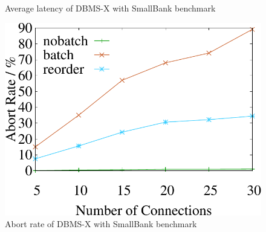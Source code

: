 \begin{figure}[t]
\begin{minipage}[b]{0.31\linewidth}
	\caption{Average latency of DBMS-X with SmallBank benchmark}
	\label{fig:hekaton:latency}
	\end{minipage}
	\begin{minipage}[b]{0.31\linewidth}
	\centering
	\includegraphics[width=\textwidth]{./exp_fig/hekaton/pdf/hekaton_abort}
	\caption{Abort rate of DBMS-X with SmallBank benchmark}
	\label{fig:hekaton:abort}
	\end{minipage}
\end{figure}

